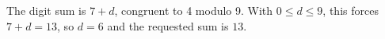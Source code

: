 The digit sum is $7+d$, congruent to 4 modulo 9. With $0\le d\le9$, this forces $7+d=13$, so $d=6$ and the requested sum is $\boxed{13}$.
